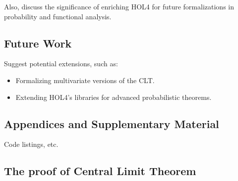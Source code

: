 Also, discuss the significance of enriching HOL4 for future formalizations in probability and functional analysis.

\subsection{Future Work}
Suggest potential extensions, such as:
\begin{itemize}
    \item Formalizing multivariate versions of the CLT.
    \item Extending HOL4’s libraries for advanced probabilistic theorems.
\end{itemize}

\subsection{Appendices and Supplementary Material}
Code listings, etc.

\subsection{The proof of Central Limit Theorem}

